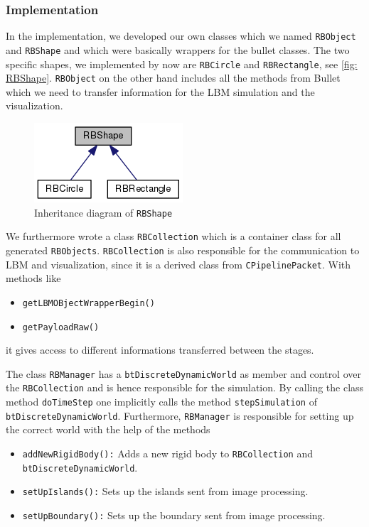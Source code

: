 \subsubsection{Implementation}
In the implementation, we developed our own classes which we named \texttt{RBObject} and \texttt{RBShape} and which were basically wrappers for the bullet classes. The two specific shapes, we implemented by now are \texttt{RBCircle} and \texttt{RBRectangle}, see \autoref{fig: RBShape}. \texttt{RBObject} on the other hand includes all the methods from Bullet which we need to transfer information for the LBM simulation and the visualization. 
\begin{figure}[ht]
\centering
\includegraphics[scale=0.5]{img/RigidBodies/RBShapeGraph.png}
\caption{Inheritance diagram of \texttt{RBShape}}
\label{fig: RBShape}
\end{figure}

We furthermore wrote a class \texttt{RBCollection} which is a container class for all generated \texttt{RBObjects}. \texttt{RBCollection} is also responsible for the communication to LBM and visualization, since it is a derived class from \texttt{CPipelinePacket}. With methods like 
\begin{itemize}
\item \texttt{getLBMOBjectWrapperBegin()}
\item \texttt{getPayloadRaw()}
\end{itemize} 
it gives access to different informations transferred between the stages. 


The class \texttt{RBManager} has a \texttt{btDiscreteDynamicWorld} as member and control over the \texttt{RBCollection} and is hence responsible for the simulation. By calling the class method \texttt{doTimeStep} one implicitly calls the method \texttt{stepSimulation} of \texttt{btDiscreteDynamicWorld}. Furthermore, \texttt{RBManager} is responsible for setting up the correct world with the help of the methods 
\begin{itemize}
\item \texttt{addNewRigidBody():} Adds a new rigid body to \texttt{RBCollection} and \texttt{btDiscreteDynamicWorld}.
\item \texttt{setUpIslands():} Sets up the islands sent from image processing.
\item \texttt{setUpBoundary():} Sets up the boundary sent from image processing.
\end{itemize}

